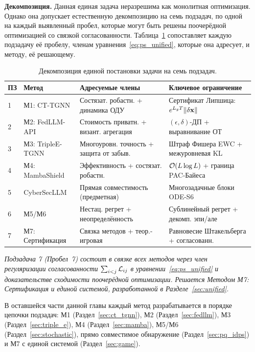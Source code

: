 \noindent\textbf{Декомпозиция.} Данная единая задача неразрешима как монолитная оптимизация. Однако она допускает естественную декомпозицию на семь подзадач, по одной на каждый выявленный пробел, которые могут быть решены поочерёдной оптимизацией со связкой согласованности. Таблица~\ref{tab:decomposition} сопоставляет каждую подзадачу её пробелу, членам уравнения~\eqref{eq:ps_unified}, которые она адресует, и методу, её решающему.

\begin{table}[htbp]
\centering
\caption{Декомпозиция единой постановки задачи на семь подзадач.}
\label{tab:decomposition}
\small
\begin{tabular}{p{0.5cm} p{3.0cm} p{4.5cm} p{5.0cm}}
\toprule
\textbf{ПЗ} & \textbf{Метод} & \textbf{Адресуемые члены} & \textbf{Ключевое ограничение} \\
\midrule
1 & М1: CT-TGNN & Состязат. робастн. + динамика ОДУ & Сертификат Липшица: $e^{L_gT}\|\delta\mathbf{x}\|$ \\
2 & М2: FedLLM-API & Стоимость приватн. + визант. агрегация & $(\epsilon,\delta)$-ДП + выравнивание ОТ \\
3 & М3: TripleE-TGNN & Многоуровн. точность + защита от забыв. & Штраф Фишера EWC + межуровневая KL \\
4 & М4: MambaShield & Эффективность + состязат. робастн. & $\mathcal{O}(L\log L)$ + граница PAC-Байеса \\
5 & CyberSecLLM & Прямая совместимость (предметная) & Многозадачные блоки ODE-S6 \\
6 & М5/М6 & Нестац. регрет + неопределённость & Сублинейный регрет + декомп. эпи/але \\
7 & М7: Сертификация & Связка методов + теор.-игровая & Равновесие Штакельберга + согласованн. \\
\bottomrule
\end{tabular}
\end{table}

\emph{Подзадача 7 (Пробел~7) состоит в связке всех методов через член регуляризации согласованности $\sum_{i<j}\mathcal{L}_{ij}$ в уравнении~\eqref{eq:ps_unified} и доказательстве сходимости поочерёдной оптимизации. Решается Методом М7: Сертификация и единой системой, разработанной в Разделе~\ref{sec:unified}.}

В оставшейся части данной главы каждый метод разрабатывается в порядке цепочки подзадач: М1 (Раздел~\ref{sec:ct_tgnn}), М2 (Раздел~\ref{sec:fedllm}), М3 (Раздел~\ref{sec:triple_e}), М4 (Раздел~\ref{sec:mamba}), М5/М6 (Раздел~\ref{sec:stochastic}), прямо совместимое обнаружение (Раздел~\ref{sec:pq_idps}) и М7 с единой системой (Раздел~\ref{sec:game}).



